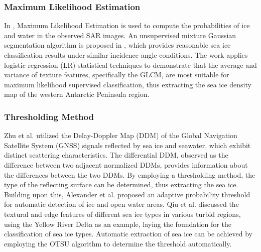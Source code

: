 \subsubsection {Maximum Likelihood Estimation}
In \cite{5scott2015assimilation}, Maximum Likelihood Estimation is used to compute the probabilities of ice and water in the observed SAR images. An unsupervised mixture Gaussian segmentation algorithm is proposed in \cite{6moen2015assessing}, which provides reasonable sea ice classification results under similar incidence angle conditions. The work \cite{8hillebrand2021application} applies logistic regression (LR) statistical techniques to demonstrate that the average and variance of texture features, specifically the GLCM, are most suitable for maximum likelihood supervised classification, thus extracting the sea ice density map of the western Antarctic Peninsula region.

\subsubsection {Thresholding Method}
Zhu et al. \cite{9zhu2017sea} utilized the Delay-Doppler Map (DDM) of the Global Navigation Satellite System (GNSS) signals reflected by sea ice and seawater, which exhibit distinct scattering characteristics. The differential DDM, observed as the difference between two adjacent normalized DDMs, provides information about the differences between the two DDMs. By employing a thresholding method, the type of the reflecting surface can be determined, thus extracting the sea ice. Building upon this, Alexander et al. \cite{10komarov2018adaptive} proposed an adaptive probability threshold for automatic detection of ice and open water areas. Qiu et al. \cite{15qiu2022automatic} discussed the textural and edge features of different sea ice types in various turbid regions, using the Yellow River Delta as an example, laying the foundation for the classification of sea ice types. Automatic extraction of sea ice can be achieved by employing the OTSU algorithm to determine the threshold automatically.

